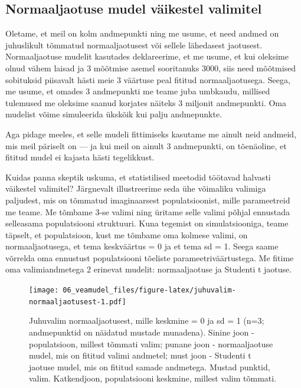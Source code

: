 \documentclass[]{book}
\begin{document}
\hypertarget{normaaljaotuse-mudel-vaikestel-valimitel}{%
\subsection*{Normaaljaotuse mudel väikestel valimitel}\label{normaaljaotuse-mudel-vaikestel-valimitel}}

Oletame, et meil on kolm andmepunkti ning me usume, et need andmed on juhuslikult tõmmatud normaaljaotusest või sellele lähedasest jaotusest. Normaaljaotuse mudelit kasutades deklareerime, et me usume, et kui oleksime olnud vähem laisad ja 3 mõõtmise asemel sooritanuks 3000, siis need mõõtmised sobituksid piisavalt hästi meie 3 väärtuse peal fititud normaaljaotusega. Seega, me usume, et omades 3 andmepunkti me teame juba umbkaudu, millised tulemused me oleksime saanud korjates näiteks 3 miljonit andmepunkti. Oma mudelist võime simuleerida ükskõik kui palju andmepunkte.

Aga pidage meeles, et selle mudeli fittimiseks kasutame me ainult neid andmeid, mis meil päriselt on --- ja kui meil on ainult 3 andmepunkti, on tõenäoline, et fititud mudel ei kajasta hästi tegelikkust.

Kuidas panna skeptik uskuma, et statistilised meetodid töötavad halvasti väikestel valimitel? Järgnevalt illustreerime seda ühe võimaliku valimiga paljudest, mis on tõmmatud imaginaarsest populatsioonist, mille parameetreid me teame. Me tõmbame 3-se valimi ning üritame selle valimi põhjal ennustada selleasama populatsiooni struktuuri. Kuna tegemist on simulatsiooniga, teame täpselt, et populatsioon, kust me tõmbame oma kolmese valimi, on normaaljaotusega, et tema keskväärtus = 0 ja et tema sd = 1. Seega saame võrrelda oma ennustust populatsiooni tõeliste parameetriväärtustega.
Me fitime oma valimiandmetega 2 erinevat mudelit: normaaljaotuse ja Studenti t jaotuse.



\begin{figure}
\centering
\texttt{[image: 06\_veamudel\_files/figure-latex/juhuvalim-normaaljaotusest-1.pdf]}
\caption{\label{fig:juhuvalim-normaaljaotusest}Juhuvalim normaaljaotusest, mille keskmine = 0 ja sd = 1 (n=3; andmepunktid on näidatud mustade munadena). Sinine joon - populatsioon, millest tõmmati valim; punane joon - normaaljaotuse mudel, mis on fititud valimi andmetel; must joon - Studenti t jaotuse mudel, mis on fititud samade andmetega. Mustad punktid, valim. Katkendjoon, populatsiooni keskmine, millest valim tõmmati.}
\end{figure}
\end{document}
